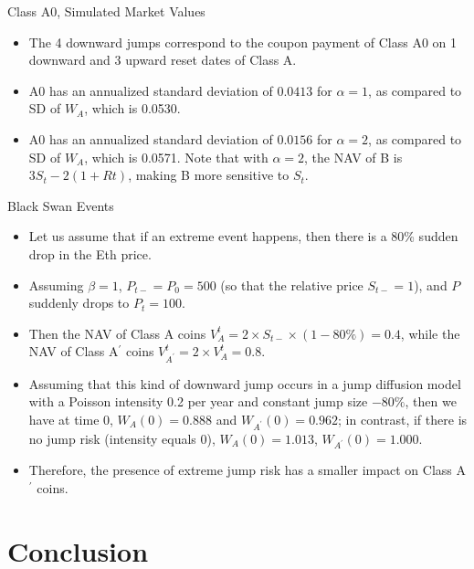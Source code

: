\documentclass[notes=show, beamer, handout]{beamer}
\begin{document}
\begin{frame}{Class A0, Simulated Market Values}

\begin{itemize}
\item The 4 downward jumps correspond to the coupon payment of Class A0 on 1 downward and 3 upward reset dates of Class A.
\item A0 has an annualized standard deviation of $0.0413$ for $\alpha=1$, 
as compared to SD of $W_{A}$, which is 0.0530.
\item A0 has an annualized standard deviation of $0.0156$ for $\alpha=2$, 
as compared to SD of $W_{A}$, which is 0.0571. Note that with $\alpha=2$, the NAV of B is $3S_t -2(1+Rt)$, making B more sensitive to $S_t$.
\end{itemize}
\end{frame}




\begin{frame}{Black Swan Events}
\begin{itemize}
  \item Let us assume that if an extreme event happens, then there is a 80\% sudden drop in the Eth price.
  \item Assuming $\beta=1$, $P_{t-}=P_0=500$ (so that the relative price $S_{t-}=1$), and $P$ suddenly drops to $P_t=100$.
  \item Then the NAV of Class A coins $V_A^t=2\times S_{t-}\times(1-80\%)=0.4$, while the NAV of Class A$^\prime$ coins $V_{A^\prime}^t=2\times V_A^t=0.8$.
  \item Assuming that this kind of downward jump occurs in a jump diffusion model with a Poisson intensity 0.2 per year and constant jump size $-80\%$, then we have at time 0,  $W_A (0) =0.888$ and $W_{A^\prime} (0) =0.962$; in contrast, if there is no jump risk (intensity equals 0), $W_A (0) =1.013$, $W_{A^\prime} (0) =1.000$. 
  \item Therefore, the presence of extreme jump risk has a smaller impact on Class A$^\prime$ coins.
\end{itemize}
\end{frame}




\section{Conclusion}
\end{document}
